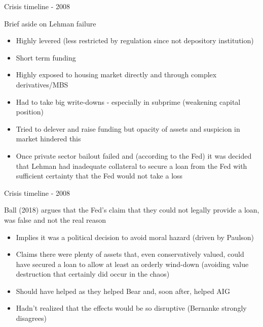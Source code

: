 \begin{frame}{Crisis timeline - 2008}

Brief aside on Lehman failure
	\begin{itemize}
	\item	Highly levered (less restricted by regulation since not depository institution)
	\item	Short term funding
	\item	Highly exposed to housing market directly and through complex derivatives/MBS
	\item	Had to take big write-downs - especially in subprime (weakening capital position)
	\item	Tried to delever and raise funding but opacity of assets and suspicion in market hindered this
	\item	Once private sector bailout failed and (according to the Fed) it was decided that Lehman had inadequate collateral to secure a loan from the Fed with sufficient certainty that the Fed would not take a loss
	\end{itemize}

\end{frame}



\begin{frame}{Crisis timeline - 2008}

Ball (2018) argues that the Fed's claim that they could not legally provide a loan, was false and not the real reason
	\begin{itemize}
	\item	Implies it was a political decision to avoid moral hazard (driven by Paulson)
	\item	Claims there were plenty of assets that, even conservatively valued, could have secured a loan to allow at least an orderly wind-down (avoiding value destruction that certainly did occur in the chaos)
	\item	Should have helped as they helped Bear and, soon after, helped AIG
	\item	Hadn't realized that the effects would be so disruptive (Bernanke strongly disagrees)
	\end{itemize}
\end{frame}



